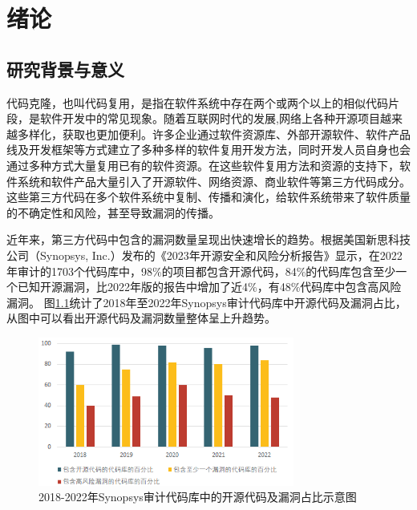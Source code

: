 \chapter{绪论}
\label{chap:intro}
\section{研究背景与意义}
代码克隆，也叫代码复用，是指在软件系统中存在两个或两个以上的相似代码片段\cite{乐乔艺2021代码克隆检测研究进展综述}，是软件开发中的常见现象。随着互联网时代的发展,网络上各种开源项目越来越多样化，获取也更加便利。许多企业通过软件资源库、外部开源软件、软件产品线及开发框架等方式建立了多种多样的软件复用开发方法，同时开发人员自身也会通过多种方式大量复用已有的软件资源。在这些软件复用方法和资源的支持下，软件系统和软件产品大量引入了开源软件、网络资源、商业软件等第三方代码成分。这些第三方代码在多个软件系统中复制、传播和演化，给软件系统带来了软件质量的不确定性和风险，甚至导致漏洞的传播。

近年来，第三方代码中包含的漏洞数量呈现出快速增长的趋势。根据美国新思科技公司（Synopsys, Inc.）发布的《2023年开源安全和风险分析报告》\cite{Synopsys_2023}显示，在2022年审计的1703个代码库中，98\%的项目都包含开源代码，84\%的代码库包含至少一个已知开源漏洞，比2022年版的报告中增加了近4\%，有48\%代码库中包含高风险漏洞。
图\ref{fig:Proportion}统计了2018年至2022年Synopsys审计代码库中开源代码及漏洞占比，从图中可以看出开源代码及漏洞数量整体呈上升趋势。
\begin{figure}[H]
    \centering
    \includegraphics[width=0.75\textwidth]{figures/Proportion}
    \caption{2018-2022年Synopsys审计代码库中的开源代码及漏洞占比示意图}\label{fig:Proportion}
\end{figure}

